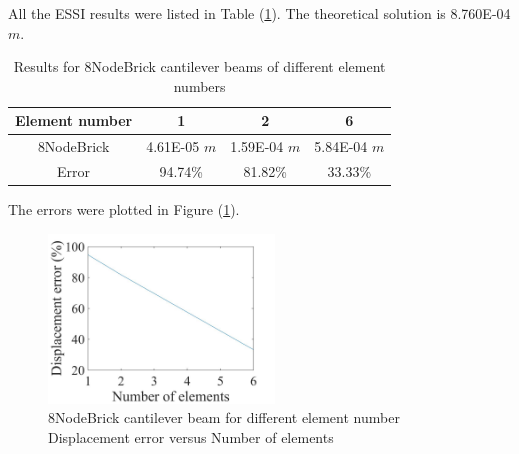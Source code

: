 \documentclass[fleqn,11pt,letter]{article}
\begin{document}





All the ESSI results were listed in Table (\ref{table 8NodeBrick cantilever beams results for different element number}). 
The theoretical solution is 8.760E-04 $m$.
\begin{table}[H]
  \centering
    \caption{Results for 8NodeBrick cantilever beams of different element numbers}
    \begin{tabular}{|c|c|c|c|}
      \hline
      Element number & 1        & 2        & 6         \\  \hline
      8NodeBrick     & 4.61E-05 $m$ & 1.59E-04 $m$ & 5.84E-04 $m$     \\ \hline
      Error           & 94.74\%  & 81.82\%  & 33.33\%           \\ 
      \hline 
    \end{tabular}
    \label{table 8NodeBrick cantilever beams results for different element number}
\end{table}

The errors were plotted in Figure (\ref{fig error 8NodeBrick cantilever beam for different element number}).
\begin{figure}[H]
    \centering
    \includegraphics[width=6cm]{../Figure_files/8NodeBrick/error8brick_beam_different_element_number.jpeg}
  \captionsetup{justification=centering,margin=3cm}
  \caption{8NodeBrick cantilever beam for different element number\\
    Displacement error   versus   Number of elements}
  \label{fig error 8NodeBrick cantilever beam for different element number}
\end{figure}
\end{document}
